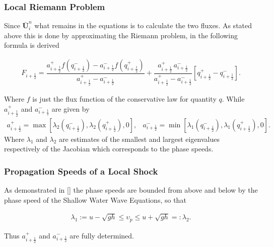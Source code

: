 \documentclass[SingleSpace,12pt]{Serre_ASCE}
\begin{document}
\subsubsection{Local Riemann Problem} %
Since $\boldsymbol{\bar{U}}^{n}_i$ what remains in the equations is to calculate the two fluxes. As stated above this is done by approximating the Riemann problem, in \cite{Kurganov-etal-2001-707} the following formula is derived
\begin{linenomath*}
\begin{gather}\label{eq:HLL_flux}
F_{i+\frac{1}{2}} = \dfrac{a^+_{i+\frac{1}{2}} f\left(q^-_{i+\frac{1}{2}}\right) - a^-_{i+\frac{1}{2}} f\left(q^+_{i+\frac{1}{2}}\right)}{a^+_{i+\frac{1}{2}} - a^-_{i+\frac{1}{2}}}  + \dfrac{a^+_{i+\frac{1}{2}} \, a^-_{i+\frac{1}{2}}}{a^+_{i+\frac{1}{2}} - a^-_{i+\frac{1}{2}}} \left [ q^+_{i+\frac{1}{2}} - q^-_{i+\frac{1}{2}} \right ].
\end{gather}
\end{linenomath*}
Where $f$ is just the flux function of the conservative law for quantity $q$.
While $a^+_{i+\frac{1}{2}}$ and $a^-_{i+\frac{1}{2}}$ are given by
\begin{subequations}
\begin{gather}
a^+_{i+\frac{1}{2}} = \max \left[\lambda_2\left(q^-_{i + \frac{1}{2}}\right), \lambda_2\left(q^+_{i + \frac{1}{2}}\right), 0 \right],
\label{eq:aatcelledgem}
\end{gather}
\begin{gather}
a^-_{i+\frac{1}{2}} = \min \left[\lambda_1\left(q^-_{i + \frac{1}{2}}\right), \lambda_1\left(q^+_{i + \frac{1}{2}}\right), 0 \right].
\label{eq:aatcelledgep}
\end{gather}
\end{subequations}
Where $\lambda_1$ and $\lambda_2$ are estimates of the smallest and largest eigenvalues respectively of the Jacobian which corresponds to the phase speeds.

\subsubsection{Propagation Speeds of a Local Shock} %
As demonstrated in \cite{Hank-etal-2010-2034} [] the phase speeds are bounded from above and below by the phase speed of the Shallow Water Wave Equations, so that
\begin{linenomath*}
\begin{gather}
 \lambda_1 := u - \sqrt{gh} \le \upsilon_p \le u + \sqrt{gh} =: \lambda_2.
\end{gather}
\end{linenomath*}
Thus $a^+_{i+\frac{1}{2}}$ and $a^-_{i+\frac{1}{2}}$ are fully determined.
\end{document}

